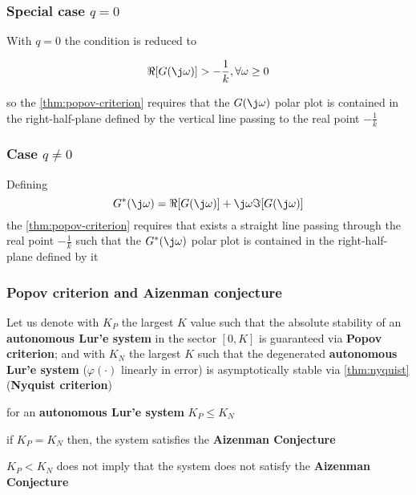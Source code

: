 \subsubsection{Special case $q=0$}

With $q=0$ the condition is reduced to

\[
    \Re [G(\j \omega)] > - \frac{1}{k}, \forall \omega \geq 0
\]

so the \cref{thm:popov-criterion} requires that the $G(\j\omega)$ polar plot is contained in the right-half-plane defined by the vertical line passing to the real point $-\frac{1}{k}$

\subsubsection{Case $q \neq 0$}

\begin{corollary}
    Defining
    \[
        G^*(\j\omega) = \Re[G(\j\omega)] + \j\omega \Im[G(\j\omega)]
    \]
    the \cref{thm:popov-criterion} requires that exists a straight line passing through the real point $-\frac{1}{k}$ such that the $G^*(\j\omega)$ polar plot is contained in the right-half-plane defined by it
\end{corollary}

\subsubsection{Popov criterion and Aizenman conjecture}

Let us denote with $K_P$ the largest $K$ value such that the absolute stability of an \textbf{autonomous Lur'e system} in the sector $[0,K]$ is guaranteed via \textbf{Popov criterion};
and with $K_N$ the largest $K$ such that the degenerated \textbf{autonomous Lur'e system} ($\varphi(\cdot)$ linearly in error) is asymptotically stable via \cref{thm:nyquist}(\textbf{Nyquist criterion})

\begin{nb} for an \textbf{autonomous Lur'e system} $K_P \leq K_N$\end{nb}

\begin{nb}if $K_P = K_N$ then, the system satisfies the \textbf{Aizenman Conjecture} \end{nb}

\begin{nb}$K_P < K_N$ does not imply that the system does not satisfy the \textbf{Aizenman Conjecture}\end{nb}

